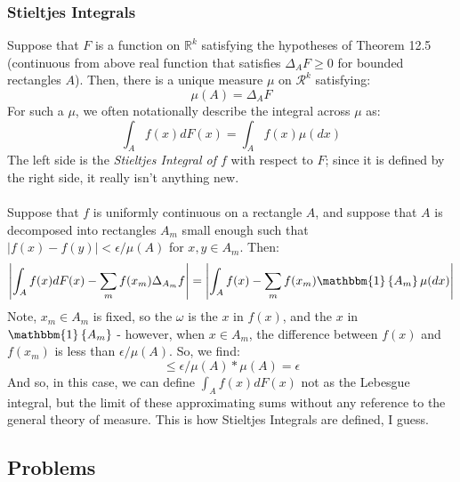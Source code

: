 \documentclass[12pt,a4paper]{article}
\newcommand{\1}[1]{\mathbbm{1}\left\{ #1 \right\}}
\newcommand{\R}{\mathbb{R}}
\newcommand{\rcal}{\mathcal{R}}
\begin{document}
\subsubsection{Stieltjes Integrals}
Suppose that $F$ is a function on $\R^k$ satisfying the hypotheses of Theorem 12.5 (continuous from above real function that satisfies $\Delta_A F \geq 0$ for bounded rectangles $A$). Then, there is a unique measure $\mu$ on $\rcal^k$ satisfying:
$$
	\mu(A) = \Delta_A F
$$
For such a $\mu$, we often notationally describe the integral across $\mu$ as:
$$
	\int_A f(x) dF(x) =
	\int_A f(x) \mu(dx)
$$
The left side is the \textit{Stieltjes Integral of $f$} with respect to $F$; since it is defined by the right side, it really isn't anything new.
\\\\
Suppose that $f$ is uniformly continuous on a rectangle $A$, and suppose that $A$ is decomposed into rectangles $A_m$ small enough such that $|f(x) - f(y)| < \epsilon/\mu(A)$ for $x,y \in A_m$. Then:
$$
	\left|\int_A f(x) dF(x) - \sum_m f(x_m) \Delta_{A_m} f\right| = 
	\left|\int_A f(x) - \sum_m f(x_m) \1{A_m} \mu(dx)\right|
$$
Note, $x_m \in A_m$ is fixed, so the $\omega$ is the $x$ in $f(x)$, and the $x$ in $\1{A_m}$ - however, when $x \in A_m$, the difference between $f(x)$ and $f(x_m)$ is less than $\epsilon/\mu(A)$. So, we find:
$$
	\leq \epsilon/\mu(A) * \mu(A) = \epsilon
$$
And so, in this case, we can define $\int_A f(x) dF(x)$ not as the Lebesgue integral, but the limit of these approximating sums without any reference to the general theory of measure. This is how Stieltjes Integrals are defined, I guess.

\subsection{Problems}
\end{document}
